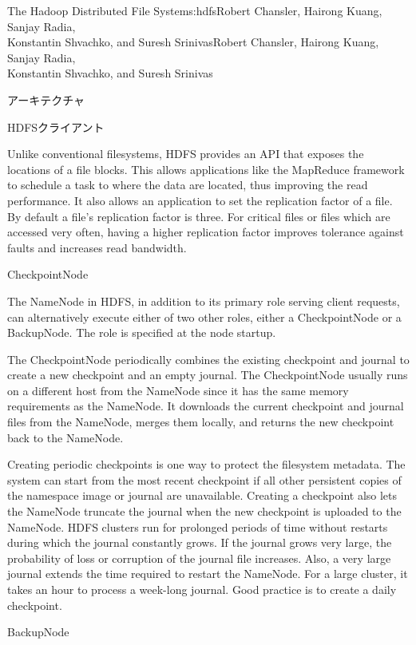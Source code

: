 \begin{aosachaptertoc}{The Hadoop Distributed File System}{s:hdfs}{Robert Chansler, Hairong Kuang, Sanjay Radia, \\ Konstantin Shvachko, and Suresh Srinivas}{Robert Chansler, Hairong Kuang, Sanjay Radia, \\ \hspace*{0.9cm} Konstantin Shvachko, and Suresh Srinivas}
\begin{aosasect1}{アーキテクチャ}
\begin{aosasect2}{HDFSクライアント}

Unlike conventional filesystems, HDFS provides an API that exposes
the locations of a file blocks.  This allows applications like the
MapReduce framework to schedule a task to where the data are located,
thus improving the read performance. It also allows an application to
set the replication factor of a file. By default a file's replication
factor is three. For critical files or files which are accessed very
often, having a higher replication factor improves tolerance against
faults and increases read bandwidth.

\end{aosasect2}

\begin{aosasect2}{CheckpointNode}

The NameNode in HDFS, in addition to its primary role serving client
requests, can alternatively execute either of two other roles, either
a CheckpointNode or a BackupNode. The role is specified at the node
startup.

The CheckpointNode periodically combines the existing checkpoint and
journal to create a new checkpoint and an empty journal. The
CheckpointNode usually runs on a different host from the NameNode
since it has the same memory requirements as the NameNode. It
downloads the current checkpoint and journal files from the NameNode,
merges them locally, and returns the new checkpoint back to the
NameNode.

Creating periodic checkpoints is one way to protect the filesystem
metadata. The system can start from the most recent checkpoint if all
other persistent copies of the namespace image or journal are
unavailable. Creating a checkpoint also lets the NameNode truncate the
journal when the new checkpoint is uploaded to the NameNode.  HDFS
clusters run for prolonged periods of time without restarts during
which the journal constantly grows. If the journal grows very large,
the probability of loss or corruption of the journal file
increases. Also, a very large journal extends the time required to
restart the NameNode. For a large cluster, it takes an hour to process
a week-long journal. Good practice is to create a daily checkpoint.

\end{aosasect2}

\begin{aosasect2}{BackupNode}


\end{aosasect2}
\end{aosasect1}
\end{aosachaptertoc}
